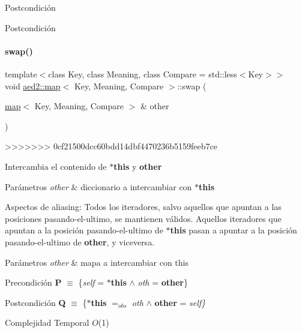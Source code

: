 \begin{DoxyPostcond}{\-Postcondición}
\begin{DoxyPostcond}{\-Postcondición}
\paragraph{\texorpdfstring{swap()}{swap()}}
{\footnotesize\ttfamily template$<$class Key, class Meaning, class Compare = std\+::less$<$\+Key$>$$>$ \\
void \hyperlink{classaed2_1_1map}{aed2\+::map}$<$ Key, Meaning, Compare $>$\+::swap (\begin{DoxyParamCaption}\item[{\hyperlink{classaed2_1_1map}{map}$<$ Key, Meaning, Compare $>$ \&}]{other }\end{DoxyParamCaption})\hspace{0.3cm}{\ttfamily [inline]}}
>>>>>>> 0cf21500dcc60bdd14dbf4470236b5159feeb7ce



Intercambia el contenido de {\bfseries $\ast$this} y {\bfseries other} 


\begin{DoxyParams}{Parámetros}
{\em other} & diccionario a intercambiar con {\bfseries $\ast$this}\\
\hline
\end{DoxyParams}
\begin{DoxyParagraph}{Aspectos de aliasing\+:}
Todos los iteradores, salvo aquellos que apuntan a las posiciones pasando-\/el-\/ultimo, se mantienen válidos. Aquellos iteradores que apuntan a la posición pasando-\/el-\/ultimo de {\bfseries $\ast$this} pasan a apuntar a la posición pasando-\/el-\/ultimo de {\bfseries other}, y viceversa.
\end{DoxyParagraph}

\begin{DoxyParams}{Parámetros}
{\em other} & mapa a intercambiar con this\\
\hline
\end{DoxyParams}
\begin{DoxyPrecond}{Precondición}
{\bfseries P} $\equiv$ \{{\itshape self} = {\bfseries $\ast$this} $\land$ {\itshape oth} = {\bfseries other}\} 
\end{DoxyPrecond}
\begin{DoxyPostcond}{Postcondición}
{\bfseries Q} $\equiv$ \{{\bfseries $\ast$this} $=_{obs}$ {\itshape oth} $\land$ {\bfseries other} = {\itshape self\}} 
\end{DoxyPostcond}

\begin{DoxyDescription}
\item[Complejidad Temporal]$O$(1)
\end{DoxyDescription}


\end{DoxyPostcond}
\end{DoxyPostcond}
